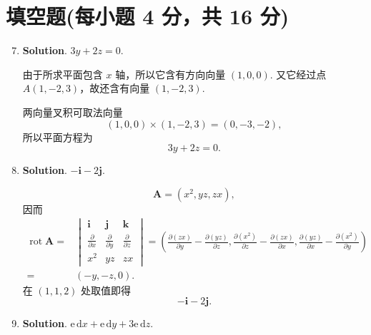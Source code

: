 \documentclass[../main.tex]{subfiles}
\begin{document}
\section{填空题(每小题 4 分，共 16 分)}
\begin{enumerate}
    \setcounter{enumi}{6}
    \item \textbf{Solution}. $3y+2z=0$.

          由于所求平面包含 \(x\) 轴，所以它含有方向向量 \((1,0,0)\). 又它经过点 \(A(1,-2,3)\)，故还含有向量 \((1,-2,3)\).

          两向量叉积可取法向量
          \[
              (1,0,0)\times(1,-2,3)=(0,-3,-2),
          \]
          所以平面方程为
          \[
              3y+2z=0.
          \]

    \item \textbf{Solution}. $-\boldsymbol{i}-2\boldsymbol{j}$.

          \[
              \boldsymbol{A}=(x^2,yz,zx),
          \]
          因而
          \[
              \begin{aligned}
                  \operatorname{rot}\boldsymbol{A}= {} & \begin{vmatrix}
                                                             \boldsymbol{i}              & \boldsymbol{j}              & \boldsymbol{k}              \\
                                                             \frac{\partial}{\partial x} & \frac{\partial}{\partial y} & \frac{\partial}{\partial z} \\
                                                             x^2                         & yz                          & zx
                                                         \end{vmatrix}
                  =                                  \left(\frac{\partial(zx)}{\partial y}-\frac{\partial(yz)}{\partial z},
                  \frac{\partial(x^2)}{\partial z}-\frac{\partial(zx)}{\partial x},
                  \frac{\partial(yz)}{\partial x}-\frac{\partial(x^2)}{\partial y}\right)                                                            \\
                  = {}                                 & (-y,-z,0).
              \end{aligned}
          \]
          在 \((1,1,2)\) 处取值即得
          \[
              -\boldsymbol{i}-2\boldsymbol{j}.
          \]

    \item \textbf{Solution}. $\mathrm{e}\,\mathrm{d}x+\mathrm{e}\,\mathrm{d}y+3\mathrm{e}\,\mathrm{d}z$.


\end{enumerate}
\end{document}
